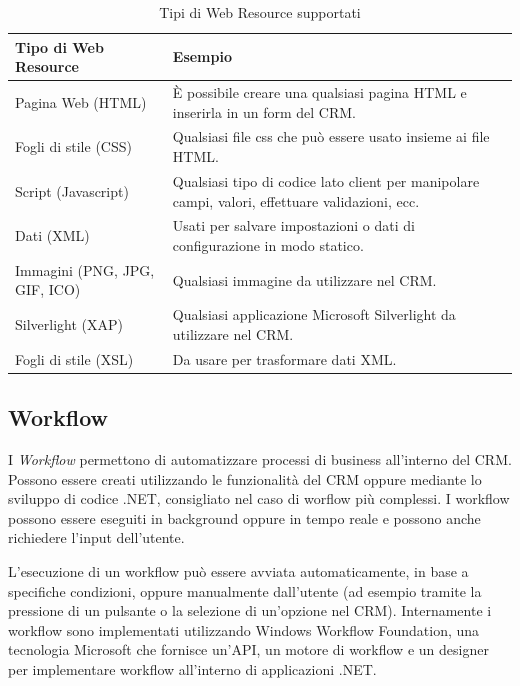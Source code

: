 \begin{table}[ht]
  \centering
  \begin{tabular}{lp{}}
    \toprule
      \textbf{Tipo di Web Resource} & \textbf{Esempio} \\ 
    \midrule
      Pagina Web (HTML) & È possibile creare una qualsiasi pagina HTML e inserirla in un form del CRM. \\
      \midrule 
      Fogli di stile (CSS) & Qualsiasi file css che può essere usato insieme ai file HTML. \\ 
      \midrule
      Script (Javascript) & Qualsiasi tipo di codice lato client per manipolare campi, valori, effettuare validazioni, ecc. \\ 
      \midrule
      Dati (XML) & Usati per salvare impostazioni o dati di configurazione in modo statico. \\
      \midrule 
      Immagini (PNG, JPG, GIF, ICO) & Qualsiasi immagine da utilizzare nel CRM.\\ 
      \midrule
      Silverlight (XAP) & Qualsiasi applicazione Microsoft Silverlight da utilizzare nel CRM. \\ 
      \midrule
      Fogli di stile (XSL) & Da usare per trasformare dati XML. \\ 
      \bottomrule
  \end{tabular}
  \caption{Tipi di Web Resource supportati}
  \label{table:webResourceType}
\end{table}

\subsection{Workflow}
I \textit{Workflow} permettono di automatizzare processi di business all'interno del CRM. Possono essere creati utilizzando le funzionalità del CRM oppure mediante lo sviluppo di codice .NET, consigliato nel caso di worflow più complessi. I workflow possono essere eseguiti in background oppure in tempo reale e possono anche richiedere l'input dell'utente.

L'esecuzione di un workflow può essere avviata automaticamente, in base a specifiche condizioni, oppure manualmente dall'utente (ad esempio tramite la pressione di un pulsante o la selezione di un'opzione nel CRM). Internamente i workflow sono implementati utilizzando Windows Workflow Foundation, una tecnologia Microsoft che fornisce un'API, un motore di workflow e un designer per implementare workflow all'interno di applicazioni .NET.

